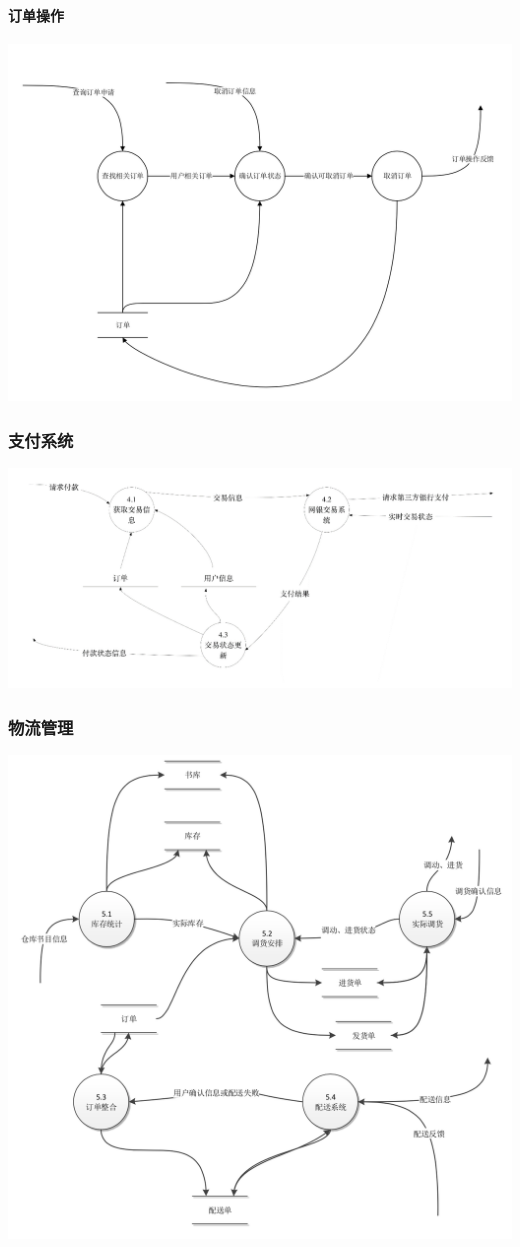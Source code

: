 \paragraph{订单操作}
\includegraphics{img/3.4.png}
\subsubsection{支付系统}
\includegraphics{img/4.png}
\subsubsection{物流管理}
\includegraphics{img/5.png}
